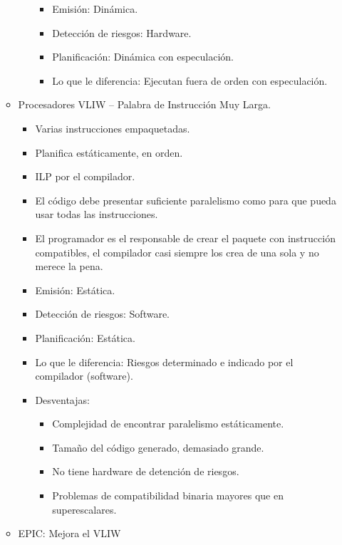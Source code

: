 \documentclass[12pt, twoside, openright]{report} %
\begin{document}
\begin{itemize}
\begin{itemize}
\begin{itemize}
        \begin{itemize}
        
        \item
          Emisión: Dinámica.
        \item
          Detección de riesgos: Hardware.
        \item
          Planificación: Dinámica con especulación.
        \item
          Lo que le diferencia: Ejecutan fuera de orden con
          especulación.
        \end{itemize}
      \end{itemize}
    \item
      Procesadores VLIW -- Palabra de Instrucción Muy Larga.

      \begin{itemize}
      
      \item
        Varias instrucciones empaquetadas.
      \item
        Planifica estáticamente, en orden.
      \item
        ILP por el compilador.
      \item
        El código debe presentar suficiente paralelismo como para que
        pueda usar todas las instrucciones.
      \item
        El programador es el responsable de crear el paquete con
        instrucción compatibles, el compilador casi siempre los crea de
        una sola y no merece la pena.
      \item
        Emisión: Estática.
      \item
        Detección de riesgos: Software.
      \item
        Planificación: Estática.
      \item
        Lo que le diferencia: Riesgos determinado e indicado por el
        compilador (software).
      \item
        Desventajas:

        \begin{itemize}
        
        \item
          Complejidad de encontrar paralelismo estáticamente.
        \item
          Tamaño del código generado, demasiado grande.
        \item
          No tiene hardware de detención de riesgos.
        \item
          Problemas de compatibilidad binaria mayores que en
          superescalares.
        \end{itemize}
      \end{itemize}
    \item
      EPIC: Mejora el VLIW


\end{itemize}
\end{itemize}
\end{document}
